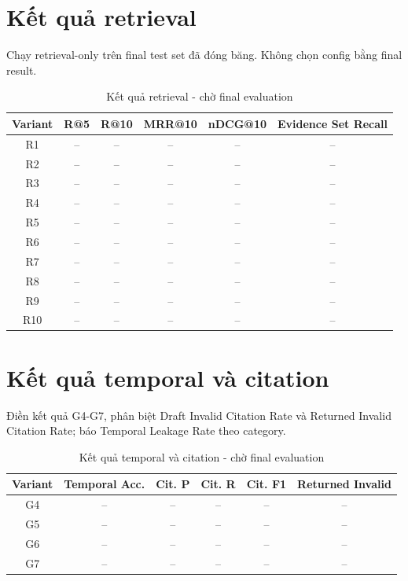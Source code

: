 \documentclass[a4paper,12pt]{extreport}
\newif\ifdraftmode
\newcommand{\pendingresult}[1]{%
  \ifdraftmode
  \begin{center}
  \fcolorbox{DraftBorder}{DraftYellow}{%
    \parbox{0.90\textwidth}{\textbf{Nội dung chờ cập nhật:} #1}
  }
  \end{center}
  \else
  #1
  \fi
}
\begin{document}
\section{Kết quả retrieval}

\pendingresult{Chạy retrieval-only trên final test set đã đóng băng. Không chọn config bằng final result.}

\begin{table}[H]
\caption{Kết quả retrieval - chờ final evaluation}
\begin{tabularx}{\textwidth}{c c c c c c}
\toprule
\textbf{Variant} & \textbf{R@5} & \textbf{R@10} & \textbf{MRR@10} & \textbf{nDCG@10} & \textbf{Evidence Set Recall}\\
\midrule
R1 & -- & -- & -- & -- & --\\
R2 & -- & -- & -- & -- & --\\
R3 & -- & -- & -- & -- & --\\
R4 & -- & -- & -- & -- & --\\
R5 & -- & -- & -- & -- & --\\
R6 & -- & -- & -- & -- & --\\
R7 & -- & -- & -- & -- & --\\
R8 & -- & -- & -- & -- & --\\
R9 & -- & -- & -- & -- & --\\
R10 & -- & -- & -- & -- & --\\
\bottomrule
\end{tabularx}
\end{table}

\section{Kết quả temporal và citation}

\pendingresult{Điền kết quả G4-G7, phân biệt Draft Invalid Citation Rate và Returned Invalid Citation Rate; báo Temporal Leakage Rate theo category.}

\begin{table}[H]
\caption{Kết quả temporal và citation - chờ final evaluation}
\begin{tabularx}{\textwidth}{c c c c c c}
\toprule
\textbf{Variant} & \textbf{Temporal Acc.} & \textbf{Cit. P} & \textbf{Cit. R} & \textbf{Cit. F1} & \textbf{Returned Invalid}\\
\midrule
G4 & -- & -- & -- & -- & --\\
G5 & -- & -- & -- & -- & --\\
G6 & -- & -- & -- & -- & --\\
G7 & -- & -- & -- & -- & --\\
\bottomrule
\end{tabularx}
\end{table}
\end{document}
